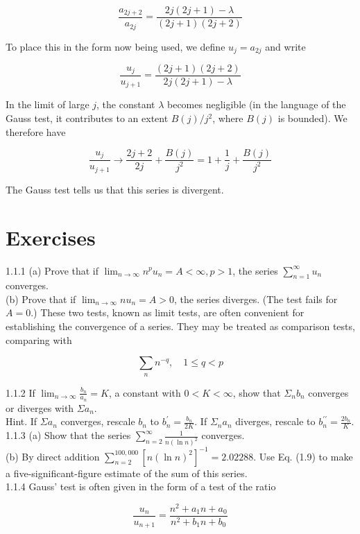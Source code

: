 \documentclass[10pt]{article}
\begin{document}
$$
\frac{a_{2 j+2}}{a_{2 j}}=\frac{2 j(2 j+1)-\lambda}{(2 j+1)(2 j+2)}
$$

To place this in the form now being used, we define $u_{j}=a_{2 j}$ and write

$$
\frac{u_{j}}{u_{j+1}}=\frac{(2 j+1)(2 j+2)}{2 j(2 j+1)-\lambda}
$$

In the limit of large $j$, the constant $\lambda$ becomes negligible (in the language of the Gauss test, it contributes to an extent $B(j) / j^{2}$, where $B(j)$ is bounded). We therefore have


\begin{equation*}
\frac{u_{j}}{u_{j+1}} \rightarrow \frac{2 j+2}{2 j}+\frac{B(j)}{j^{2}}=1+\frac{1}{j}+\frac{B(j)}{j^{2}} \tag{1.20}
\end{equation*}


The Gauss test tells us that this series is divergent.

\section*{Exercises}
1.1.1 (a) Prove that if $\lim _{n \rightarrow \infty} n^{p} u_{n}=A<\infty, p>1$, the series $\sum_{n=1}^{\infty} u_{n}$ converges.\\
(b) Prove that if $\lim _{n \rightarrow \infty} n u_{n}=A>0$, the series diverges. (The test fails for $A=0$.) These two tests, known as limit tests, are often convenient for establishing the convergence of a series. They may be treated as comparison tests, comparing with

$$
\sum_{n} n^{-q}, \quad 1 \leq q<p
$$

1.1.2 If $\lim _{n \rightarrow \infty} \frac{b_{n}}{a_{n}}=K$, a constant with $0<K<\infty$, show that $\Sigma_{n} b_{n}$ converges or diverges with $\Sigma a_{n}$.\\
Hint. If $\Sigma a_{n}$ converges, rescale $b_{n}$ to $b_{n}^{\prime}=\frac{b_{n}}{2 K}$. If $\Sigma_{n} a_{n}$ diverges, rescale to $b_{n}^{\prime \prime}=\frac{2 b_{n}}{K}$.\\
1.1.3 (a) Show that the series $\sum_{n=2}^{\infty} \frac{1}{n(\ln n)^{2}}$ converges.\\
(b) By direct addition $\sum_{n=2}^{100,000}\left[n(\ln n)^{2}\right]^{-1}=2.02288$. Use Eq. (1.9) to make a five-significant-figure estimate of the sum of this series.\\
1.1.4 Gauss' test is often given in the form of a test of the ratio

$$
\frac{u_{n}}{u_{n+1}}=\frac{n^{2}+a_{1} n+a_{0}}{n^{2}+b_{1} n+b_{0}}
$$
\end{document}

